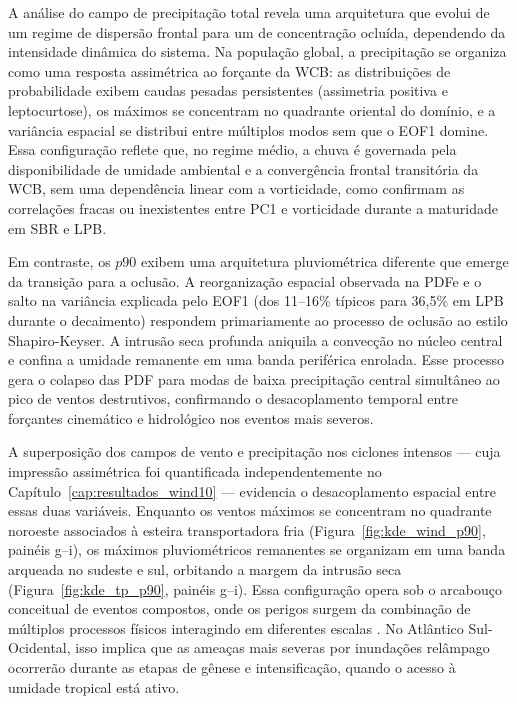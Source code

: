 A análise do campo de precipitação total revela uma arquitetura que evolui de um regime de dispersão frontal para um de concentração ocluída, dependendo da intensidade dinâmica do sistema.
Na população global, a precipitação se organiza como uma resposta assimétrica ao forçante da WCB: as distribuições de probabilidade exibem caudas pesadas persistentes (assimetria positiva e leptocurtose), os máximos se concentram no quadrante oriental do domínio, e a variância espacial se distribui entre múltiplos modos sem que o EOF1 domine.
Essa configuração reflete que, no regime médio, a chuva é governada pela disponibilidade de umidade ambiental e a convergência frontal transitória da WCB, sem uma dependência linear com a vorticidade, como confirmam as correlações fracas ou inexistentes entre PC1 e vorticidade durante a maturidade em SBR e LPB.

Em contraste, os $p90$ exibem uma arquitetura pluviométrica diferente que emerge da transição para a oclusão. A reorganização espacial observada na PDFe e o salto na variância explicada pelo EOF1 (dos 11--16\% típicos para 36,5\% em LPB durante o decaimento) respondem primariamente ao processo de oclusão ao estilo Shapiro-Keyser. A intrusão seca profunda aniquila a convecção no núcleo central e confina a umidade remanente em uma banda periférica enrolada.
Esse processo gera o colapso das PDF para modas de baixa precipitação central simultâneo ao pico de ventos destrutivos, confirmando o desacoplamento temporal entre forçantes cinemático e hidrológico nos eventos mais severos.

A superposição dos campos de vento e precipitação nos ciclones intensos --- cuja impressão assimétrica foi quantificada independentemente no Capítulo~\ref{cap:resultados_wind10} --- evidencia o desacoplamento espacial entre essas duas variáveis.
Enquanto os ventos máximos se concentram no quadrante noroeste associados à esteira transportadora fria (Figura~\ref{fig:kde_wind_p90}, painéis g--i), os máximos pluviométricos remanentes se organizam em uma banda arqueada no sudeste e sul, orbitando a margem da intrusão seca (Figura~\ref{fig:kde_tp_p90}, painéis g--i).
Essa configuração opera sob o arcabouço conceitual de eventos compostos, onde os perigos surgem da combinação de múltiplos processos físicos interagindo em diferentes escalas \citep{zscheischler2018future}.
No Atlântico Sul-Ocidental, isso implica que as ameaças mais severas por inundações relâmpago ocorrerão durante as etapas de gênese e intensificação, quando o acesso à umidade tropical está ativo.

